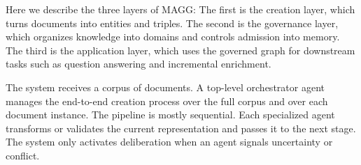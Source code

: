 \documentclass{article}
\begin{document}
Here we describe the three layers of MAGG: The first is the creation layer, which turns documents into entities and triples. The second is the governance layer, which organizes knowledge into domains and controls admission into memory. The third is the application layer, which uses the governed graph for downstream tasks such as question answering and incremental enrichment.

The system receives a corpus of documents. A top-level orchestrator agent manages the end-to-end creation process over the full corpus and over each document instance. The pipeline is mostly sequential. Each specialized agent transforms or validates the current representation and passes it to the next stage. The system only activates deliberation when an agent signals uncertainty or conflict.

\end{document}
